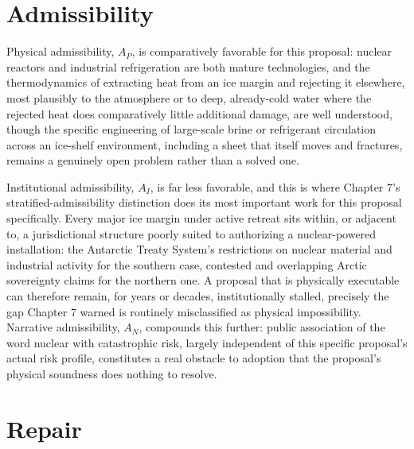 \documentclass[11pt,oneside]{book}
\begin{document}
\section*{Admissibility}

Physical admissibility, $A_P$, is comparatively favorable for this proposal: nuclear reactors and industrial refrigeration are both mature technologies, and the thermodynamics of extracting heat from an ice margin and rejecting it elsewhere, most plausibly to the atmosphere or to deep, already-cold water where the rejected heat does comparatively little additional damage, are well understood, though the specific engineering of large-scale brine or refrigerant circulation across an ice-shelf environment, including a sheet that itself moves and fractures, remains a genuinely open problem rather than a solved one.

Institutional admissibility, $A_I$, is far less favorable, and this is where Chapter 7's stratified-admissibility distinction does its most important work for this proposal specifically. Every major ice margin under active retreat sits within, or adjacent to, a jurisdictional structure poorly suited to authorizing a nuclear-powered installation: the Antarctic Treaty System's restrictions on nuclear material and industrial activity for the southern case, contested and overlapping Arctic sovereignty claims for the northern one. A proposal that is physically executable can therefore remain, for years or decades, institutionally stalled, precisely the gap Chapter 7 warned is routinely misclassified as physical impossibility. Narrative admissibility, $A_N$, compounds this further: public association of the word nuclear with catastrophic risk, largely independent of this specific proposal's actual risk profile, constitutes a real obstacle to adoption that the proposal's physical soundness does nothing to resolve.

\section*{Repair}
\end{document}
